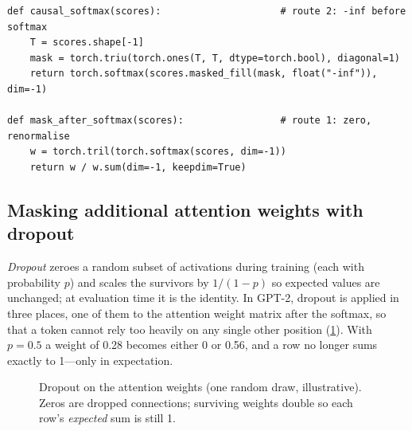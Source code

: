 \begin{lstlisting}[caption={Two routes to causal weights; they are equal to float precision.},label={lst:attention:causalroutes}]
def causal_softmax(scores):                     # route 2: -inf before softmax
    T = scores.shape[-1]
    mask = torch.triu(torch.ones(T, T, dtype=torch.bool), diagonal=1)
    return torch.softmax(scores.masked_fill(mask, float("-inf")), dim=-1)

def mask_after_softmax(scores):                 # route 1: zero, renormalise
    w = torch.tril(torch.softmax(scores, dim=-1))
    return w / w.sum(dim=-1, keepdim=True)
\end{lstlisting}

\subsection{Masking additional attention weights with dropout}
\emph{Dropout} zeroes a random subset of activations during training (each with probability $p$)
and scales the survivors by $1/(1-p)$ so expected values are unchanged; at evaluation time it is
the identity. In GPT-2, dropout is applied in three places, one of them to the attention weight
matrix after the softmax, so that a token cannot rely too heavily on any single other position
(\cref{fig:attention:dropout}). With $p=0.5$ a weight of 0.28 becomes either 0 or 0.56, and a row
no longer sums exactly to 1---only in expectation.

\begin{figure}[t]
\centering
{}
\caption{Dropout on the attention weights (one random draw, illustrative). Zeros are dropped
connections; surviving weights double so each row's \emph{expected} sum is still 1.}
\label{fig:attention:dropout}
\end{figure}

